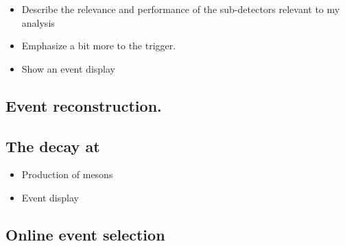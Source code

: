

\begin{itemize}
  \item Describe the relevance and performance of the sub-detectors relevant to my analysis
  \item Emphasize a bit more to the trigger.
  \item Show an event display
\end{itemize}


\subsection{Event reconstruction.}
\label{reconstruction}

\subsection{The \BsJpsiKst decay at \lhcb}
\label{BspsiKst_at_lhcb}

\begin{itemize}
  \item Production of \Bs mesons
  \item Event display
\end{itemize}

\subsection{Online event selection}
